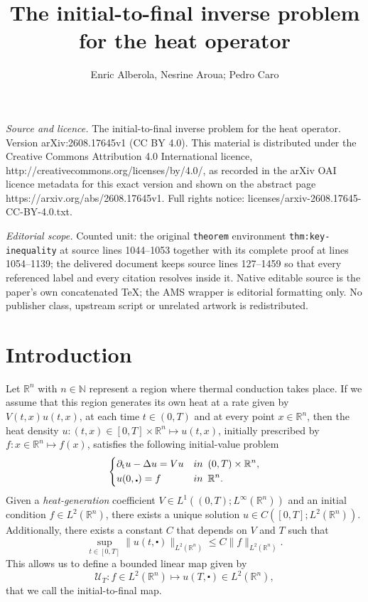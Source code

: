 \documentclass[10pt,a4paper]{amsart}
\newcommand{\R}{\mathbb{R}}
\newcommand{\N}{\mathbb{N}}
\newcommand{\tm}{\mathrm{t}}
\newcommand{\marnote}[1]{\marginpar{\footnotesize #1}} %
\begin{document}
\title[The initial-to-final inverse problem for the heat operator]{The initial-to-final inverse problem for the heat operator}
\author{Enric Alberola, Nesrine Aroua; Pedro Caro}
\date{}
\maketitle
\noindent\emph{Source and licence.} The initial-to-final inverse problem for the heat operator. Version arXiv:2608.17645v1 (CC BY 4.0). This material is distributed under the Creative Commons Attribution 4.0 International licence, http://creativecommons.org/licenses/by/4.0/, as recorded in the arXiv OAI licence metadata for this exact version and shown on the abstract page https://arxiv.org/abs/2608.17645v1. Full rights notice: licenses/arxiv-2608.17645-CC-BY-4.0.txt.\par\smallskip
\noindent\textit{Editorial scope.} Counted unit: the original \texttt{theorem} environment \texttt{thm:key-inequality} at source lines 1044--1053 together with its complete proof at lines 1054--1139; the delivered document keeps source lines 127--1459 so that every referenced label and every citation resolves inside it. Native editable source is the paper's own concatenated TeX; the AMS wrapper is editorial formatting only. No publisher class, upstream script or unrelated artwork is redistributed.
\section{Introduction}\label{sec: intro}
Let $\R^n$ with $n \in \N$ represent a region where thermal conduction takes place.
If we assume that this region generates its own heat at a rate given by 
$V(t, x) u(t, x)$, at each time $t \in (0, T)$ and at every point $x \in \R^n$,
then the heat density 
$u : (t, x) \in [0,T] \times \R^n \mapsto u(t, x) $,
initially prescribed by $f : x \in \R^n \mapsto f(x)$, satisfies the following initial-value problem
\begin{equation}
	\left\{
		\begin{aligned}
		& \partial_\tm u - \Delta u = V u & & \textnormal{in} \enspace (0,T) \times \R^n, \\
		& u(0, \centerdot) = f &  & \textnormal{in} \enspace \R^n.
		\end{aligned}
	\right.
	\label{pb:IVP}
\end{equation}
Given a \textit{heat-generation} coefficient $V \in L^1((0,T); L^\infty(\R^n))$
and an initial condition $f \in L^2(\R^n)$,
there exists a unique solution
$u \in C([0,T]; L^2(\R^n))$.
Additionally, there exists a constant $C$ that depends on $V$ and $T$ such that
\[ \sup_{t \in [0,T]} \| u(t, \centerdot) \|_{L^2 (\R^n)} \leq C \| f \|_{L^2(\R^n)}. \]
This allows us to define a bounded linear map given by
\[ \mathcal{U}_T : f \in L^2(\R^n) \longmapsto u(T, \centerdot) \in L^2(\R^n), \]
that we call the initial-to-final map.
\end{document}
